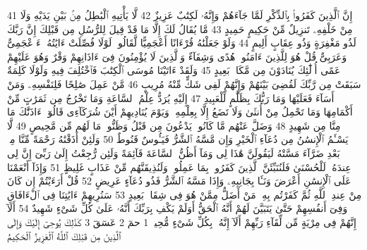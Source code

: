 {\tiny\colorbox{cl_aya}{41}} إِنَّ ٱلَّذِينَ كَفَرُوا۟ بِٱلذِّكْرِ لَمَّا جَآءَهُمْ وَإِنَّهُۥ لَكِتَٰبٌ عَزِيزٌ
{\tiny\colorbox{cl_aya}{42}} لَّا يَأْتِيهِ ٱلْبَٰطِلُ مِنۢ بَيْنِ يَدَيْهِ وَلَا مِنْ خَلْفِهِۦ تَنزِيلٌ مِّنْ حَكِيمٍ حَمِيدٍ
{\tiny\colorbox{cl_aya}{43}} مَّا يُقَالُ لَكَ إِلَّا مَا قَدْ قِيلَ لِلرُّسُلِ مِن قَبْلِكَ إِنَّ رَبَّكَ لَذُو مَغْفِرَةٍ وَذُو عِقَابٍ أَلِيمٍ
{\tiny\colorbox{cl_aya}{44}} وَلَوْ جَعَلْنَٰهُ قُرْءَانًا أَعْجَمِيًّا لَّقَالُوا۟ لَوْلَا فُصِّلَتْ ءَايَٰتُهُۥٓ ءَا۬عْجَمِىٌّ وَعَرَبِىٌّ قُلْ هُوَ لِلَّذِينَ ءَامَنُوا۟ هُدًى وَشِفَآءٌ وَٱلَّذِينَ لَا يُؤْمِنُونَ فِىٓ ءَاذَانِهِمْ وَقْرٌ وَهُوَ عَلَيْهِمْ عَمًى أُو۟لَٰٓئِكَ يُنَادَوْنَ مِن مَّكَانٍۭ بَعِيدٍ
{\tiny\colorbox{cl_aya}{45}} وَلَقَدْ ءَاتَيْنَا مُوسَى ٱلْكِتَٰبَ فَٱخْتُلِفَ فِيهِ وَلَوْلَا كَلِمَةٌ سَبَقَتْ مِن رَّبِّكَ لَقُضِىَ بَيْنَهُمْ وَإِنَّهُمْ لَفِى شَكٍّ مِّنْهُ مُرِيبٍ
{\tiny\colorbox{cl_aya}{46}} مَّنْ عَمِلَ صَٰلِحًا فَلِنَفْسِهِۦ وَمَنْ أَسَآءَ فَعَلَيْهَا وَمَا رَبُّكَ بِظَلَّٰمٍ لِّلْعَبِيدِ
{\tiny\colorbox{cl_aya}{47}} إِلَيْهِ يُرَدُّ عِلْمُ ٱلسَّاعَةِ وَمَا تَخْرُجُ مِن ثَمَرَٰتٍ مِّنْ أَكْمَامِهَا وَمَا تَحْمِلُ مِنْ أُنثَىٰ وَلَا تَضَعُ إِلَّا بِعِلْمِهِۦ وَيَوْمَ يُنَادِيهِمْ أَيْنَ شُرَكَآءِى قَالُوٓا۟ ءَاذَنَّٰكَ مَا مِنَّا مِن شَهِيدٍ
{\tiny\colorbox{cl_aya}{48}} وَضَلَّ عَنْهُم مَّا كَانُوا۟ يَدْعُونَ مِن قَبْلُ وَظَنُّوا۟ مَا لَهُم مِّن مَّحِيصٍ
{\tiny\colorbox{cl_aya}{49}} لَّا يَسْـَٔمُ ٱلْإِنسَٰنُ مِن دُعَآءِ ٱلْخَيْرِ وَإِن مَّسَّهُ ٱلشَّرُّ فَيَـُٔوسٌ قَنُوطٌ
{\tiny\colorbox{cl_aya}{50}} وَلَئِنْ أَذَقْنَٰهُ رَحْمَةً مِّنَّا مِنۢ بَعْدِ ضَرَّآءَ مَسَّتْهُ لَيَقُولَنَّ هَٰذَا لِى وَمَآ أَظُنُّ ٱلسَّاعَةَ قَآئِمَةً وَلَئِن رُّجِعْتُ إِلَىٰ رَبِّىٓ إِنَّ لِى عِندَهُۥ لَلْحُسْنَىٰ فَلَنُنَبِّئَنَّ ٱلَّذِينَ كَفَرُوا۟ بِمَا عَمِلُوا۟ وَلَنُذِيقَنَّهُم مِّنْ عَذَابٍ غَلِيظٍ
{\tiny\colorbox{cl_aya}{51}} وَإِذَآ أَنْعَمْنَا عَلَى ٱلْإِنسَٰنِ أَعْرَضَ وَنَـَٔا بِجَانِبِهِۦ وَإِذَا مَسَّهُ ٱلشَّرُّ فَذُو دُعَآءٍ عَرِيضٍ
{\tiny\colorbox{cl_aya}{52}} قُلْ أَرَءَيْتُمْ إِن كَانَ مِنْ عِندِ ٱللَّهِ ثُمَّ كَفَرْتُم بِهِۦ مَنْ أَضَلُّ مِمَّنْ هُوَ فِى شِقَاقٍۭ بَعِيدٍ
{\tiny\colorbox{cl_aya}{53}} سَنُرِيهِمْ ءَايَٰتِنَا فِى ٱلْءَافَاقِ وَفِىٓ أَنفُسِهِمْ حَتَّىٰ يَتَبَيَّنَ لَهُمْ أَنَّهُ ٱلْحَقُّ أَوَلَمْ يَكْفِ بِرَبِّكَ أَنَّهُۥ عَلَىٰ كُلِّ شَىْءٍ شَهِيدٌ
{\tiny\colorbox{cl_aya}{54}} أَلَآ إِنَّهُمْ فِى مِرْيَةٍ مِّن لِّقَآءِ رَبِّهِمْ أَلَآ إِنَّهُۥ بِكُلِّ شَىْءٍ مُّحِيطٌۢ
{\tiny\colorbox{cl_aya}{1}} حمٓ
{\tiny\colorbox{cl_aya}{2}} عٓسٓقٓ
{\tiny\colorbox{cl_aya}{3}} كَذَٰلِكَ يُوحِىٓ إِلَيْكَ وَإِلَى ٱلَّذِينَ مِن قَبْلِكَ ٱللَّهُ ٱلْعَزِيزُ ٱلْحَكِيمُ
